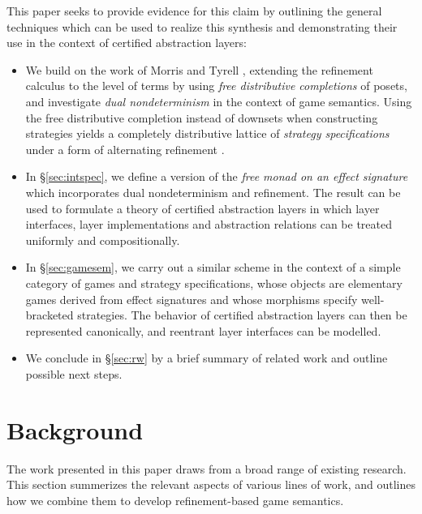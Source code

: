 \documentclass[sigplan,10pt,review,anonymous]{acmart}
\begin{document}
This paper seeks to provide evidence for this claim
by outlining the general techniques
which can be used to realize this synthesis
and demonstrating their use
in the context of certified abstraction layers:
\begin{itemize}
\item
  We build on the work of Morris and Tyrell \cite{augtyp,dndf},
  extending the refinement calculus to the level of terms
  by using \emph{free distributive completions} of posets,
  and investigate \emph{dual nondeterminism}
  in the context of game semantics.
  Using the free distributive completion
  instead of downsets when constructing strategies
  yields a completely distributive lattice of
  \emph{strategy specifications}
  under a form of alternating refinement
  \cite{altref}.
\item
  In \S\ref{sec:intspec},
  we define a version of the
  \emph{free monad on an effect signature}
  which incorporates dual nondeterminism and refinement.
  The result can be used to formulate a theory of certified abstraction
  layers in which
  layer interfaces, layer implementations and abstraction relations
  can be treated uniformly and compositionally.
\item
  In \S\ref{sec:gamesem},
  we carry out a similar scheme
  in the context of a simple category of games and
  strategy specifications,
  whose objects are elementary games derived from effect signatures
  and whose morphisms specify well-bracketed strategies.
  The behavior of certified abstraction layers
  can then be represented canonically,
  and reentrant layer interfaces can be modelled.
\item
  We conclude in \S\ref{sec:rw}
  by a brief summary of related work
  and outline possible next steps.
\end{itemize}



\section{Background} \label{sec:background} %


The work presented in this paper
draws from a broad range of existing research.
This section summerizes the relevant aspects
of various lines of work,
and outlines how we combine them
to develop
refinement-based game semantics.

\end{document}
